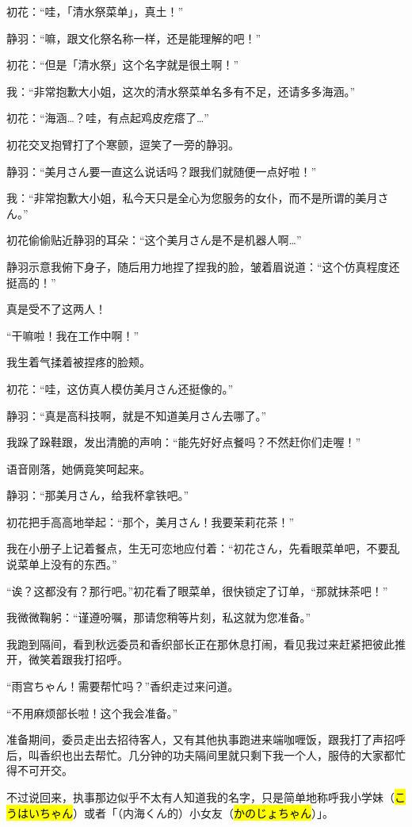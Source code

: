 初花：“哇，「清水祭菜单」，真土！”

静羽：“嘛，跟文化祭名称一样，还是能理解的吧！”

初花：“但是「清水祭」这个名字就是很土啊！”

我：“非常抱歉大小姐，这次的清水祭菜单名多有不足，还请多多海涵。”

初花：“海涵…？哇，有点起鸡皮疙瘩了…”

初花交叉抱臂打了个寒颤，逗笑了一旁的静羽。

静羽：“美月さん要一直这么说话吗？跟我们就随便一点好啦！”

我：“非常抱歉大小姐，私今天只是全心为您服务的女仆，而不是所谓的美月さん。”

初花偷偷贴近静羽的耳朵：“这个美月さん是不是机器人啊…”

静羽示意我俯下身子，随后用力地捏了捏我的脸，皱着眉说道：“这个仿真程度还挺高的！”

真是受不了这两人！

“干嘛啦！我在工作中啊！”

我生着气揉着被捏疼的脸颊。

初花：“哇，这仿真人模仿美月さん还挺像的。”

静羽：“真是高科技啊，就是不知道美月さん去哪了。”

我跺了跺鞋跟，发出清脆的声响：“能先好好点餐吗？不然赶你们走喔！”

语音刚落，她俩竟笑呵起来。

静羽：“那美月さん，给我杯拿铁吧。”

初花把手高高地举起：“那个，美月さん！我要茉莉花茶！”

我在小册子上记着餐点，生无可恋地应付着：“初花さん，先看眼菜单吧，不要乱说菜单上没有的东西。”

“诶？这都没有？那行吧。”初花看了眼菜单，很快锁定了订单，“那就抹茶吧！”

我微微鞠躬：“谨遵吩嘱，那请您稍等片刻，私这就为您准备。”

我跑到隔间，看到秋远委员和香织部长正在那休息打闹，看见我过来赶紧把彼此推开，微笑着跟我打招呼。

“雨宫ちゃん！需要帮忙吗？”香织走过来问道。

“不用麻烦部长啦！这个我会准备。”

准备期间，委员走出去招待客人，又有其他执事跑进来端咖喱饭，跟我打了声招呼后，叫香织也出去帮忙。几分钟的功夫隔间里就只剩下我一个人，服侍的大家都忙得不可开交。

不过说回来，执事那边似乎不太有人知道我的名字，只是简单地称呼我小学妹（\hl{こうはいちゃん}）或者「（内海くん的）小女友（\hl{かのじょちゃん}）」。

